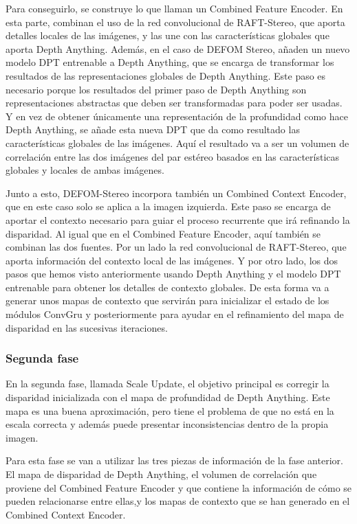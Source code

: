 Para conseguirlo, se construye lo que llaman un Combined Feature Encoder. En esta parte, combinan el uso de la red convolucional de RAFT-Stereo, que aporta detalles locales de las imágenes, y las une con las características globales que aporta Depth Anything. Además, en el caso de DEFOM Stereo, añaden un nuevo modelo DPT entrenable a Depth Anything, que se encarga de transformar los resultados de las representaciones globales de Depth Anything. Este paso es necesario porque los resultados del primer paso de Depth Anything son representaciones abstractas que deben ser transformadas para poder ser usadas. Y en vez de obtener únicamente una representación de la profundidad como hace Depth Anything, se añade esta nueva DPT que da como resultado las características globales de las imágenes. Aquí el resultado va a ser un volumen de correlación entre las dos imágenes del par estéreo basados en las características globales y locales de ambas imágenes.

Junto a esto, DEFOM-Stereo incorpora también un Combined Context Encoder, que en este caso solo se aplica a la imagen izquierda. Este paso se encarga de aportar el contexto necesario para guiar el proceso recurrente que irá refinando la disparidad. Al igual que en el Combined Feature Encoder, aquí también se combinan las dos fuentes. Por un lado la red convolucional de RAFT-Stereo, que aporta información del contexto local de las imágenes. Y por otro lado, los dos pasos que hemos visto anteriormente usando Depth Anything y el modelo DPT entrenable para obtener los detalles de contexto globales. De esta forma va a generar unos mapas de contexto que servirán para inicializar el estado de los módulos ConvGru y posteriormente para ayudar en el refinamiento del mapa de disparidad en las sucesivas iteraciones.

\subsubsection{Segunda fase}
En la segunda fase, llamada Scale Update, el objetivo principal es corregir la disparidad inicializada con el mapa de profundidad de Depth Anything. Este mapa es una buena aproximación, pero tiene el problema de que no está en la escala correcta y además puede presentar inconsistencias dentro de la propia imagen.

Para esta fase se van a utilizar las tres piezas de información de la fase anterior. El mapa de disparidad de Depth Anything, el volumen de correlación que proviene del Combined Feature Encoder y que contiene la información de cómo se pueden relacionarse entre ellas,y los mapas de contexto que se han generado en el Combined Context Encoder.

